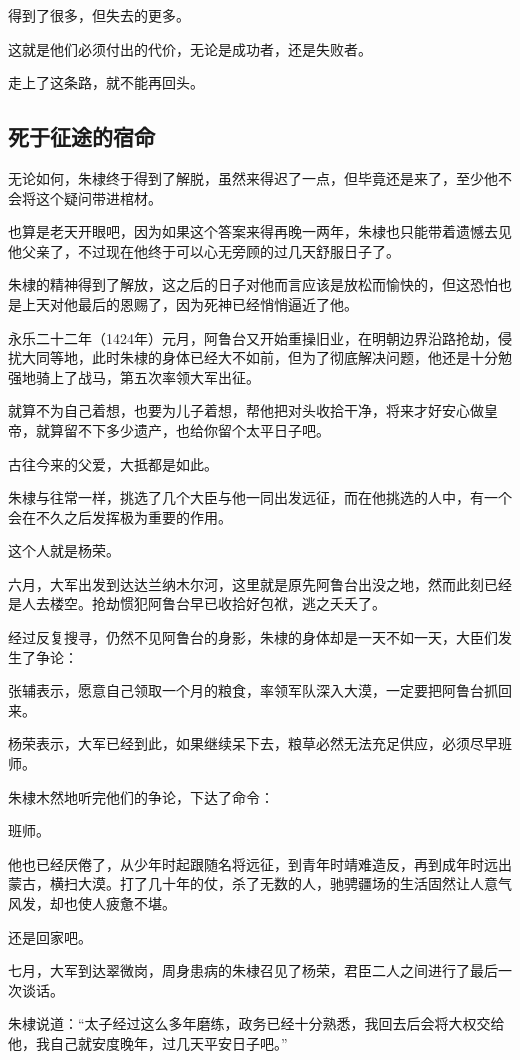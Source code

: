 \begin{multicols}{\theparacolNo}
得到了很多，但失去的更多。

这就是他们必须付出的代价，无论是成功者，还是失败者。

走上了这条路，就不能再回头。

\subsection{死于征途的宿命}
无论如何，朱棣终于得到了解脱，虽然来得迟了一点，但毕竟还是来了，至少他不会将这个疑问带进棺材。

也算是老天开眼吧，因为如果这个答案来得再晚一两年，朱棣也只能带着遗憾去见他父亲了，不过现在他终于可以心无旁顾的过几天舒服日子了。

朱棣的精神得到了解放，这之后的日子对他而言应该是放松而愉快的，但这恐怕也是上天对他最后的恩赐了，因为死神已经悄悄逼近了他。

永乐二十二年（1424年）元月，阿鲁台又开始重操旧业，在明朝边界沿路抢劫，侵扰大同等地，此时朱棣的身体已经大不如前，但为了彻底解决问题，他还是十分勉强地骑上了战马，第五次率领大军出征。

就算不为自己着想，也要为儿子着想，帮他把对头收拾干净，将来才好安心做皇帝，就算留不下多少遗产，也给你留个太平日子吧。

古往今来的父爱，大抵都是如此。

朱棣与往常一样，挑选了几个大臣与他一同出发远征，而在他挑选的人中，有一个会在不久之后发挥极为重要的作用。

这个人就是杨荣。

六月，大军出发到达达兰纳木尔河，这里就是原先阿鲁台出没之地，然而此刻已经是人去楼空。抢劫惯犯阿鲁台早已收拾好包袱，逃之夭夭了。

经过反复搜寻，仍然不见阿鲁台的身影，朱棣的身体却是一天不如一天，大臣们发生了争论：

张辅表示，愿意自己领取一个月的粮食，率领军队深入大漠，一定要把阿鲁台抓回来。

杨荣表示，大军已经到此，如果继续呆下去，粮草必然无法充足供应，必须尽早班师。

朱棣木然地听完他们的争论，下达了命令：

班师。

他也已经厌倦了，从少年时起跟随名将远征，到青年时靖难造反，再到成年时远出蒙古，横扫大漠。打了几十年的仗，杀了无数的人，驰骋疆场的生活固然让人意气风发，却也使人疲惫不堪。

还是回家吧。

七月，大军到达翠微岗，周身患病的朱棣召见了杨荣，君臣二人之间进行了最后一次谈话。

朱棣说道：“太子经过这么多年磨练，政务已经十分熟悉，我回去后会将大权交给他，我自己就安度晚年，过几天平安日子吧。”


\end{multicols}
